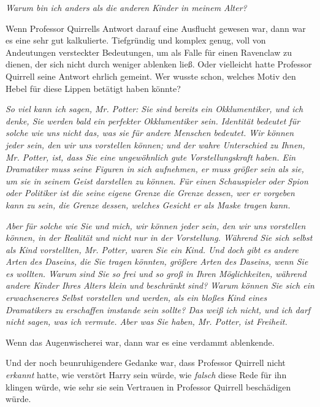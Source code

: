 {\emph{\emph{Warum bin ich anders als die anderen Kinder in meinem Alter?}}

Wenn Professor Quirrells Antwort darauf eine Ausflucht gewesen war, dann war es eine sehr gut kalkulierte. Tiefgründig und komplex genug, voll von Andeutungen versteckter Bedeutungen, um als Falle für einen Ravenclaw zu dienen, der sich nicht durch weniger ablenken ließ. Oder vielleicht hatte Professor Quirrell seine Antwort ehrlich gemeint. Wer wusste schon, welches Motiv den Hebel für diese Lippen betätigt haben könnte?

\emph{\emph{So viel kann ich sagen, Mr. Potter: Sie sind bereits ein Okklumentiker, und ich denke, Sie werden bald ein perfekter Okklumentiker} \emph{sein. Identität bedeutet für solche wie uns nicht das, was sie für andere Menschen bedeutet.} \emph{Wir können} \emph{jeder sein, den wir uns vorstellen können; und der wahre Unterschied zu Ihnen, Mr. Potter, ist, dass Sie eine ungewöhnlich gute Vorstellungskraft haben. Ein Dramatiker muss seine Figuren in sich aufnehmen, er muss größer sein als sie, um sie in seinem Geist darstellen zu können. Für einen Schauspieler oder Spion oder Politiker ist die seine eigene Grenze die Grenze dessen, wer er vorgeben kann zu sein, die Grenze dessen, welches Gesicht er als Maske tragen} \emph{kann.}}

\emph{\emph{Aber für solche wie Sie und} \emph{mich,} \emph{wir können jeder sein, den wir uns vorstellen können, in der Realität und nicht} \emph{nur in der Vorstellung. Während Sie sich} \emph{selbst als} \emph{Kind vorstellten, Mr. Potter,} waren \emph{Sie ein Kind. Und doch gibt es andere} \emph{Arten des Daseins, die Sie} \emph{tragen} \emph{könnten, größere} \emph{Arten des Daseins, wenn Sie es wollten. Warum} \emph{sind Sie} \emph{so frei und so groß in} \emph{Ihren Möglichkeiten, während andere Kinder} \emph{Ihres} \emph{Alters klein und beschränkt sind? Warum können Sie sich} \emph{ein erwachseneres Selbst vorstellen und} werden\emph{, als ein bloßes Kind eines Dramatikers zu} \emph{erschaffen} \emph{imstande sein sollte? Das weiß ich nicht, und ich darf nicht sagen, was ich vermute. Aber was Sie haben, Mr. Potter, ist Freiheit.}}

Wenn das Augenwischerei war, dann war es eine verdammt ablenkende.

Und der noch beunruhigendere Gedanke war, dass Professor Quirrell nicht \emph{erkannt} hatte, wie verstört Harry sein würde, wie \emph{falsch} diese Rede für ihn klingen würde, wie sehr sie sein Vertrauen in Professor Quirrell beschädigen würde.

}
